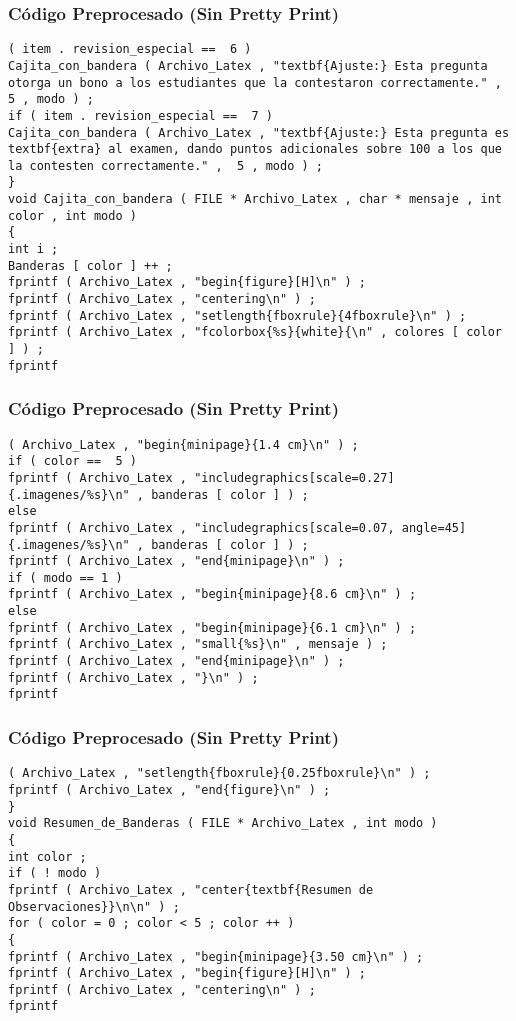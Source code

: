 \documentclass{beamer}
\begin{document}
\begin{frame}[fragile]
\frametitle{C\'odigo Preprocesado (Sin Pretty Print)}
\begin{lstlisting}[style=CStyle]
( item . revision_especial ==  6 ) 
Cajita_con_bandera ( Archivo_Latex , "textbf{Ajuste:} Esta pregunta otorga un bono a los estudiantes que la contestaron correctamente." ,  5 , modo ) ; 
if ( item . revision_especial ==  7 ) 
Cajita_con_bandera ( Archivo_Latex , "textbf{Ajuste:} Esta pregunta es textbf{extra} al examen, dando puntos adicionales sobre 100 a los que la contesten correctamente." ,  5 , modo ) ; 
} 
void Cajita_con_bandera ( FILE * Archivo_Latex , char * mensaje , int color , int modo ) 
{ 
int i ; 
Banderas [ color ] ++ ; 
fprintf ( Archivo_Latex , "begin{figure}[H]\n" ) ; 
fprintf ( Archivo_Latex , "centering\n" ) ; 
fprintf ( Archivo_Latex , "setlength{fboxrule}{4fboxrule}\n" ) ; 
fprintf ( Archivo_Latex , "fcolorbox{%s}{white}{\n" , colores [ color ] ) ; 
fprintf \end{lstlisting}
\end{frame}
\begin{frame}[fragile]
\frametitle{C\'odigo Preprocesado (Sin Pretty Print)}
\begin{lstlisting}[style=CStyle]
( Archivo_Latex , "begin{minipage}{1.4 cm}\n" ) ; 
if ( color ==  5 ) 
fprintf ( Archivo_Latex , "includegraphics[scale=0.27]{.imagenes/%s}\n" , banderas [ color ] ) ; 
else 
fprintf ( Archivo_Latex , "includegraphics[scale=0.07, angle=45]{.imagenes/%s}\n" , banderas [ color ] ) ; 
fprintf ( Archivo_Latex , "end{minipage}\n" ) ; 
if ( modo == 1 ) 
fprintf ( Archivo_Latex , "begin{minipage}{8.6 cm}\n" ) ; 
else 
fprintf ( Archivo_Latex , "begin{minipage}{6.1 cm}\n" ) ; 
fprintf ( Archivo_Latex , "small{%s}\n" , mensaje ) ; 
fprintf ( Archivo_Latex , "end{minipage}\n" ) ; 
fprintf ( Archivo_Latex , "}\n" ) ; 
fprintf \end{lstlisting}
\end{frame}
\begin{frame}[fragile]
\frametitle{C\'odigo Preprocesado (Sin Pretty Print)}
\begin{lstlisting}[style=CStyle]
( Archivo_Latex , "setlength{fboxrule}{0.25fboxrule}\n" ) ; 
fprintf ( Archivo_Latex , "end{figure}\n" ) ; 
} 
void Resumen_de_Banderas ( FILE * Archivo_Latex , int modo ) 
{ 
int color ; 
if ( ! modo ) 
fprintf ( Archivo_Latex , "center{textbf{Resumen de Observaciones}}\n\n" ) ; 
for ( color = 0 ; color < 5 ; color ++ ) 
{ 
fprintf ( Archivo_Latex , "begin{minipage}{3.50 cm}\n" ) ; 
fprintf ( Archivo_Latex , "begin{figure}[H]\n" ) ; 
fprintf ( Archivo_Latex , "centering\n" ) ; 
fprintf \end{lstlisting}
\end{frame}
\end{document}
